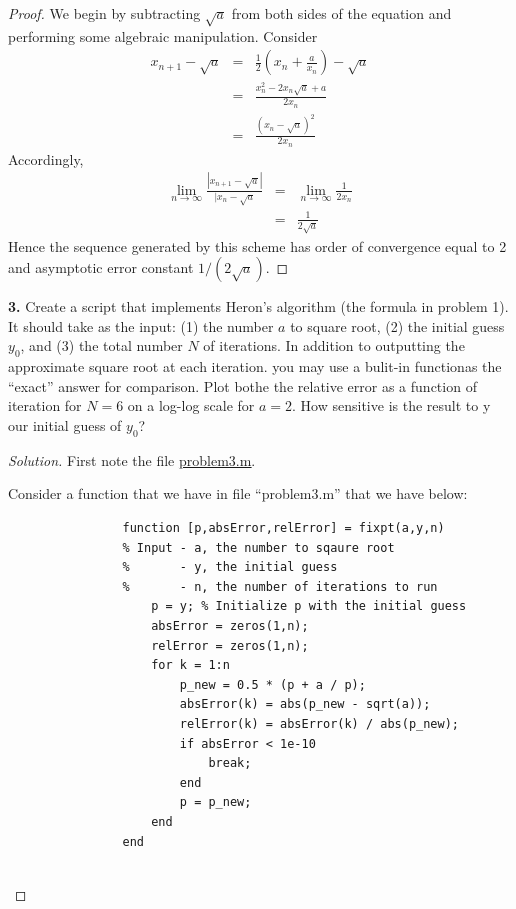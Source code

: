 \documentclass[12pt]{amsart}
\newenvironment{solution}
{\begin{proof}[Solution]}
{\end{proof}}
\begin{document}
\begin{onehalfspace}
\begin{proof}
            We begin by subtracting $\sqrt{a}$ from both sides of the equation and performing some
            algebraic manipulation. Consider
            \begin{eqnarray*}
                x_{n+1} - \sqrt{a} & = & \frac{1}{2} \left(x_n + \frac{a}{x_n}\right) - \sqrt{a} \\
                                   & = & \frac{x_n^2 - 2x_n\sqrt{a} + a}{2x_n} \\
                                   & = & \frac{(x_n - \sqrt{a})^2}{2x_n}
            \end{eqnarray*}
            Accordingly,
            \begin{eqnarray*}
                \lim_{n\rightarrow\infty} \frac{|x_{n+1} - \sqrt{a}|}{|x_n - \sqrt{a}} & = & \lim_{n\rightarrow\infty} \frac{1}{2x_n} \\
                 & = & \frac{1}{2\sqrt{a}}
            \end{eqnarray*}
            Hence the sequence generated by this scheme has order of convergence equal to 2 and asymptotic error constant
            $1/(2\sqrt{a})$.
        \end{proof}

        \textbf{3.} Create a script that implements Heron's algorithm (the formula in problem 1). It should take as the
        input: (1) the number $a$ to square root, (2) the initial guess $y_0$, and (3) the total number $N$ of iterations.
        In addition to outputting the approximate square root at each iteration. you may use a bulit-in functionas the
        ``exact'' answer for comparison. Plot bothe the relative error as a function of iteration for $N = 6$ on a
        log-log scale for $a = 2$. How sensitive is the result to y our initial guess of $y_0$?

        \begin{solution}
            First note the file
            \underline{\href{https://github.com/chtompki/MathSpring2026/blob/main/NumericalAnalysis/GuidedLab1/problem3.m}{problem3.m}}.

            Consider a function that we have in file ``problem3.m'' that we have below:
            \begin{verbatim}
                function [p,absError,relError] = fixpt(a,y,n)
                % Input - a, the number to sqaure root
                %       - y, the initial guess
                %       - n, the number of iterations to run
                    p = y; % Initialize p with the initial guess
                    absError = zeros(1,n);
                    relError = zeros(1,n);
                    for k = 1:n
                        p_new = 0.5 * (p + a / p);
                        absError(k) = abs(p_new - sqrt(a));
                        relError(k) = absError(k) / abs(p_new);
                        if absError < 1e-10
                            break;
                        end
                        p = p_new;
                    end
                end


\end{verbatim}
\end{solution}
\end{onehalfspace}
\end{document}
